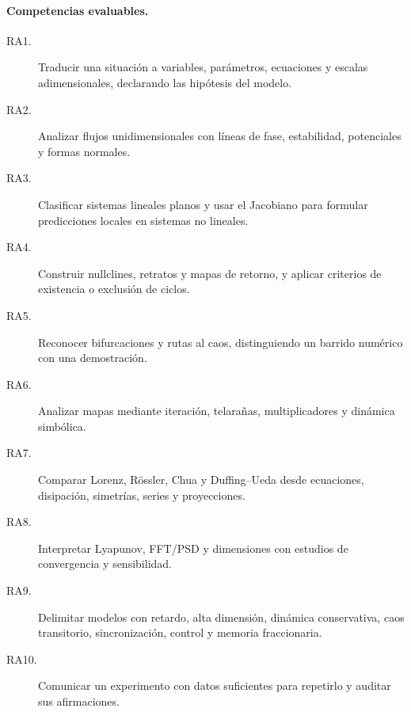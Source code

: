 
\paragraph{Competencias evaluables.}
\begin{description}
  \item[RA1.] Traducir una situación a variables, parámetros, ecuaciones y escalas
  adimensionales, declarando las hipótesis del modelo.
  \item[RA2.] Analizar flujos unidimensionales con líneas de fase, estabilidad,
  potenciales y formas normales.
  \item[RA3.] Clasificar sistemas lineales planos y usar el Jacobiano para formular
  predicciones locales en sistemas no lineales.
  \item[RA4.] Construir nullclines, retratos y mapas de retorno, y aplicar criterios
  de existencia o exclusión de ciclos.
  \item[RA5.] Reconocer bifurcaciones y rutas al caos, distinguiendo un barrido
  numérico con una demostración.
  \item[RA6.] Analizar mapas mediante iteración, telarañas, multiplicadores y
  dinámica simbólica.
  \item[RA7.] Comparar Lorenz, Rössler, Chua y Duffing--Ueda desde ecuaciones,
  disipación, simetrías, series y proyecciones.
  \item[RA8.] Interpretar Lyapunov, FFT/PSD y dimensiones con estudios de
  convergencia y sensibilidad.
  \item[RA9.] Delimitar modelos con retardo, alta dimensión, dinámica conservativa,
  caos transitorio, sincronización, control y memoria fraccionaria.
  \item[RA10.] Comunicar un experimento con datos suficientes para repetirlo y
  auditar sus afirmaciones.
\end{description}

